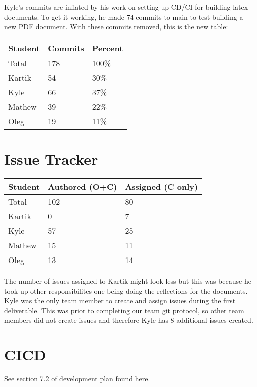 \documentclass{article}
\begin{document}
Kyle's commits are inflated by his work on setting up CD/CI for building latex documents. To get it working, he made 74 commits to main to test building a new PDF document. With these commits removed, this is the new table:\\
\begin{table}[H]
    \centering
    \begin{tabular}{lll}
    \toprule
    \textbf{Student} & \textbf{Commits} & \textbf{Percent}\\
    \midrule
    Total & 178 & 100\% \\
    Kartik & 54 & 30\%\\
    Kyle   & 66 & 37\%\\
    Mathew & 39 & 22\%\\
    Oleg   & 19 & 11\%\\
    \bottomrule
    \end{tabular}
    \end{table}
\section{Issue Tracker}


\begin{table}[H]
\centering
\begin{tabular}{lll}
\toprule
\textbf{Student} & \textbf{Authored (O+C)} & \textbf{Assigned (C only)}\\
\midrule
Total & 102 & 80 \\
Kartik & 0 & 7\\
Kyle   & 57 & 25\\
Mathew & 15 & 11\\
Oleg   & 13 & 14\\
\bottomrule
\end{tabular}
\end{table}

The number of issues assigned to Kartik might look less but this was because he took up other responsibilites one being doing the reflections for the documents.\\
Kyle was the only team member to create and assign issues during the first deliverable. This was prior to completing our team git protocol, so other team members did not create issues and therefore Kyle has 8 additional issues created.
\section{CICD}

See section 7.2 of development plan found \href{https://github.com/OKKM-insights/OKKM.insights/blob/main/docs/DevelopmentPlan/DevelopmentPlan.pdf}{here}.

\end{document}
